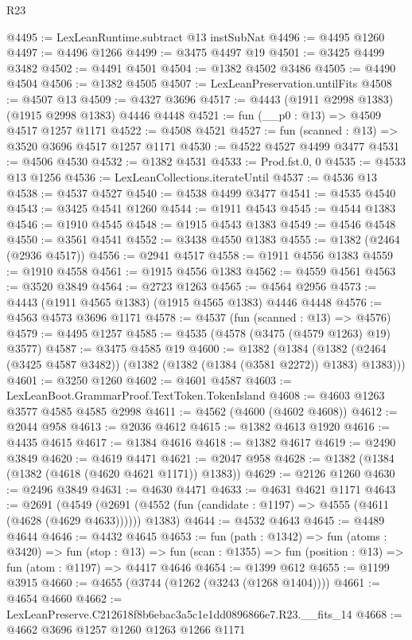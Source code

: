 \begin{lexlean}{R23}
\begin{coremodule}
@4495 := LexLeanRuntime.subtract @13 instSubNat
@4496 := @4495 @1260
@4497 := @4496 @1266
@4499 := @3475 @4497 @19
@4501 := @3425 @4499 @3482
@4502 := @4491 @4501
@4504 := @1382 @4502 @3486
@4505 := @4490 @4504
@4506 := @1382 @4505
@4507 := LexLeanPreservation.untilFits
@4508 := @4507 @13
@4509 := @4327 @3696
@4517 := @4443 (@1911 @2998 @1383) (@1915 @2998 @1383) @4446 @4448
@4521 := fun (__p0 : @13) => @4509 @4517 @1257 @1171
@4522 := @4508 @4521
@4527 := fun (scanned : @13) => @3520 @3696 @4517 @1257 @1171
@4530 := @4522 @4527 @4499 @3477
@4531 := @4506 @4530
@4532 := @1382 @4531
@4533 := Prod.fst.{0, 0}
@4535 := @4533 @13 @1256
@4536 := LexLeanCollections.iterateUntil
@4537 := @4536 @13
@4538 := @4537 @4527
@4540 := @4538 @4499 @3477
@4541 := @4535 @4540
@4543 := @3425 @4541 @1260
@4544 := @1911 @4543
@4545 := @4544 @1383
@4546 := @1910 @4545
@4548 := @1915 @4543 @1383
@4549 := @4546 @4548
@4550 := @3561 @4541
@4552 := @3438 @4550 @1383
@4555 := @1382 (@2464 (@2936 @4517))
@4556 := @2941 @4517
@4558 := @1911 @4556 @1383
@4559 := @1910 @4558
@4561 := @1915 @4556 @1383
@4562 := @4559 @4561
@4563 := @3520 @3849
@4564 := @2723 @1263
@4565 := @4564 @2956
@4573 := @4443 (@1911 @4565 @1383) (@1915 @4565 @1383) @4446 @4448
@4576 := @4563 @4573 @3696 @1171
@4578 := @4537 (fun (scanned : @13) => @4576)
@4579 := @4495 @1257
@4585 := @4535 (@4578 (@3475 (@4579 @1263) @19) @3577)
@4587 := @3475 @4585 @19
@4600 := @1382
    (@1384 (@1382 (@2464 (@3425 @4587 @3482)) (@1382 (@1382 (@1384 (@3581 @2272)) @1383) @1383)))
@4601 := @3250 @1260
@4602 := @4601 @4587
@4603 := LexLeanBoot.GrammarProof.TextToken.TokenIsland
@4608 := @4603 @1263 @3577 @4585 @4585 @2998
@4611 := @4562 (@4600 (@4602 @4608))
@4612 := @2044 @958
@4613 := @2036 @4612
@4615 := @1382 @4613 @1920
@4616 := @4435 @4615
@4617 := @1384 @4616
@4618 := @1382 @4617
@4619 := @2490 @3849
@4620 := @4619 @4471
@4621 := @2047 @958
@4628 := @1382 (@1384 (@1382 (@4618 (@4620 @4621 @1171)) @1383))
@4629 := @2126 @1260
@4630 := @2496 @3849
@4631 := @4630 @4471
@4633 := @4631 @4621 @1171
@4643 := @2691
    (@4549 (@2691 (@4552 (fun (candidate : @1197) => @4555 (@4611 (@4628 (@4629 @4633)))))) @1383)
@4644 := @4532 @4643
@4645 := @4489 @4644
@4646 := @4432 @4645
@4653 := fun (path : @1342) =>
  fun (atoms : @3420) =>
  fun (stop : @13) =>
  fun (scan : @1355) => fun (position : @13) => fun (atom : @1197) => @4417 @4646
@4654 := @1399 @612
@4655 := @1199 @3915
@4660 := @4655 (@3744 (@1262 (@3243 (@1268 @1404))))
@4661 := @4654 @4660
@4662 := LexLeanPreserve.C212618f8b6ebac3a5c1e1dd0896866e7.R23.__fits_14
@4668 := @4662 @3696 @1257 @1260 @1263 @1266 @1171

\end{coremodule}
\end{lexlean}
